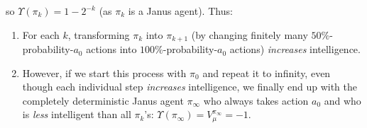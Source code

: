 \documentclass[runningheads]{llncs}
\begin{document}
\begin{example}
    so $\Upsilon(\pi_k)=1-2^{-k}$ (as $\pi_k$ is a Janus agent).
    Thus:
    \begin{enumerate}
        \item For each $k$, transforming $\pi_k$ into $\pi_{k+1}$
            (by changing finitely many $50\%$-probability-$a_0$
            actions into $100\%$-probability-$a_0$ actions)
            \emph{increases} intelligence.
        \item However, if we start this process with $\pi_0$ and
            repeat it to infinity, even though each individual step
            \emph{increases} intelligence, we finally end up with
            the completely deterministic
            Janus agent $\pi_{\infty}$ who always takes action $a_0$ and who is
            \emph{less} intelligent than all $\pi_k$'s:
            $\Upsilon(\pi_{\infty})=V^{\pi_\infty}_\mu=-1$.
    \end{enumerate}
\end{example}



\end{document}
